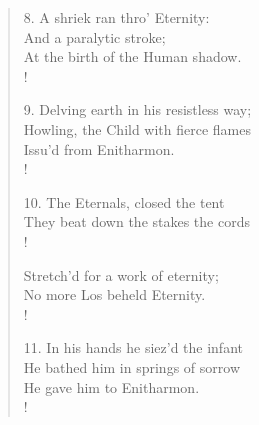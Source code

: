 \documentclass[9pt]{extarticle}
\begin{document}
\begin{verse}
\begin{altverse}
		8. A shriek ran thro' Eternity:\\
		And a paralytic stroke;\\
		At the birth of the Human shadow.\\!
		
		9. Delving earth in his resistless way;\\
		Howling, the Child with fierce flames\\
		Issu'd from Enitharmon.\\!
		
		10. The Eternals, closed the tent\\
		They beat down the stakes the cords\\!
		
		Stretch'd for a work of eternity;\\
		No more Los beheld Eternity.\\!
		
		11. In his hands he siez'd the infant\\
		He bathed him in springs of sorrow\\
		He gave him to Enitharmon.\\!
		
\end{altverse}
\end{verse}	
\end{document}
